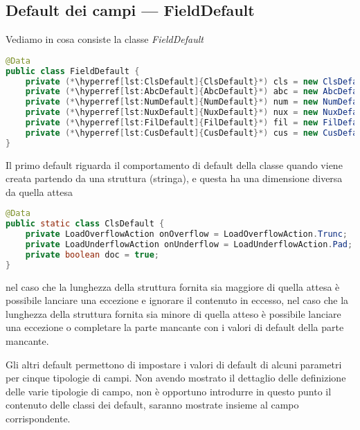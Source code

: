 \documentclass[a4paper,10pt]{report}
\begin{document}
\subsection{Default dei campi --- FieldDefault}
Vediamo in cosa consiste la classe \textsl{FieldDefault}

\begin{figure*}[!htb]
\begin{lstlisting}[language=java, caption=class FieldDefault, 
label=lst:FieldDefault]
@Data
public class FieldDefault {
    private (*\hyperref[lst:ClsDefault]{ClsDefault}*) cls = new ClsDefault();
    private (*\hyperref[lst:AbcDefault]{AbcDefault}*) abc = new AbcDefault();
    private (*\hyperref[lst:NumDefault]{NumDefault}*) num = new NumDefault();
    private (*\hyperref[lst:NuxDefault]{NuxDefault}*) nux = new NuxDefault();
    private (*\hyperref[lst:FilDefault]{FilDefault}*) fil = new FilDefault();
    private (*\hyperref[lst:CusDefault]{CusDefault}*) cus = new CusDefault();
}
\end{lstlisting}
\end{figure*}
Il primo default riguarda il comportamento di default della classe quando viene 
creata partendo da una struttura (stringa), e questa ha una dimensione diversa 
da quella attesa

\begin{figure*}[!htb]
\begin{lstlisting}[language=java, caption=classe ClsDefault, 
label=lst:ClsDefault]
@Data
public static class ClsDefault {
    private LoadOverflowAction onOverflow = LoadOverflowAction.Trunc;   // enum {Error, Trunc}
    private LoadUnderflowAction onUnderflow = LoadUnderflowAction.Pad;  // enum {Error, Pad}
    private boolean doc = true;
}
\end{lstlisting}
\end{figure*}
nel caso che la lunghezza della struttura fornita sia maggiore di quella attesa
è possibile lanciare una eccezione e ignorare il contenuto in eccesso,
nel caso che la lunghezza della struttura fornita sia minore di quella atteso è
possibile lanciare una eccezione o completare la parte mancante con i valori di
default della parte mancante.

Gli altri default permettono di impostare i valori di default di alcuni 
parametri per cinque tipologie di campi. Non avendo mostrato il dettaglio delle 
definizione delle varie tipologie di campo, non è opportuno introdurre in 
questo punto il contenuto delle classi dei default, saranno mostrate insieme al 
campo corrispondente.
\end{document}
